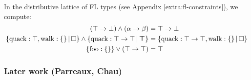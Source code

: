 \begin{example}
    In the distributive lattice of FL types (see Appendix \ref{extra:fl-constraints}), we compute:
    \begin{align*}
        (\top \to \bot) \meet (\alpha \to \beta) &= \top \to \bot \\ 
        \flext{\mathrm{quack} : \top, \mathrm{walk} : \flrec{}}{\flabsent} \meet \flext{\mathrm{quack} : \top \to \top}{\flftop} &= \flext{\mathrm{quack}: \top \to \top, \mathrm{walk}: \flrec{}}{\flabsent} \\ 
        \flrec{\mathrm{foo}: \flrec{}} \join (\top \to \top) &= \top
    \end{align*}
\end{example}

\subsubsection{Later work (Parreaux, Chau)}
\label{subsubsec:parreaux}

